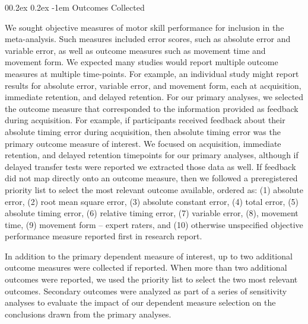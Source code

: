 \documentclass[
  english,
  man,mask,floatsintext]{apa7}
\makeatletter
\let\oldparagraph\paragraph
\renewcommand{\paragraph}[1]{\oldparagraph{#1}\mbox{}}
\renewcommand{\paragraph}{\@startsection{paragraph}{4}{\parindent}%
  {0\baselineskip \@plus 0.2ex \@minus 0.2ex}%
  {-1em}%
  {\normalfont\normalsize\bfseries\itshape\typesectitle}}
\makeatother
\begin{document}
\hypertarget{outcomes-collected}{%
\paragraph{Outcomes Collected}\label{outcomes-collected}}

We sought objective measures of motor skill performance for inclusion in the meta-analysis. Such measures included error scores, such as absolute error and variable error, as well as outcome measures such as movement time and movement form. We expected many studies would report multiple outcome measures at multiple time-points. For example, an individual study might report results for absolute error, variable error, and movement form, each at acquisition, immediate retention, and delayed retention. For our primary analyses, we selected the outcome measure that corresponded to the information provided as feedback during acquisition. For example, if participants received feedback about their absolute timing error during acquisition, then absolute timing error was the primary outcome measure of interest. We focused on acquisition, immediate retention, and delayed retention timepoints for our primary analyses, although if delayed transfer tests were reported we extracted those data as well. If feedback did not map directly onto an outcome measure, then we followed a preregistered priority list to select the most relevant outcome available, ordered as: (1) absolute error, (2) root mean square error, (3) absolute constant error, (4) total error, (5) absolute timing error, (6) relative timing error, (7) variable error, (8), movement time, (9) movement form -- expert raters, and (10) otherwise unspecified objective performance measure reported first in research report.

In addition to the primary dependent measure of interest, up to two additional outcome measures were collected if reported. When more than two additional outcomes were reported, we used the priority list to select the two most relevant outcomes. Secondary outcomes were analyzed as part of a series of sensitivity analyses to evaluate the impact of our dependent measure selection on the conclusions drawn from the primary analyses.
\end{document}
